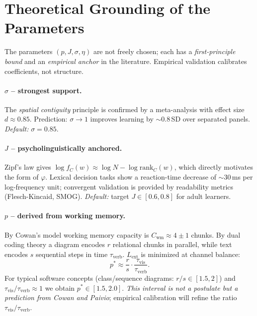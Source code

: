 \documentclass[10pt,a4paper]{article}
\begin{document}
\section{Theoretical Grounding of the Parameters}

The parameters $(p, J, \sigma, \eta)$ are not freely chosen; each has
a \emph{first-principle bound} and an \emph{empirical anchor} in the
literature. Empirical validation calibrates coefficients, not structure.

\paragraph{$\sigma$ – strongest support.}
The \emph{spatial contiguity} principle \cite{mayer2021} is confirmed
by a meta-analysis \cite{ginns2006} with effect size $d \approx 0.85$.
Prediction: $\sigma \to 1$ improves learning by $\sim 0.8$\,SD over
separated panels. \emph{Default:} $\sigma = 0.85$.

\paragraph{$J$ – psycholinguistically anchored.}
Zipf's law gives $\log f_C(w) \approx \log N - \log \mathrm{rank}_C(w)$,
which directly motivates the form of $\varphi$. Lexical decision tasks
\cite{brysbaert2018} show a reaction-time decrease of $\sim\!30$\,ms
per log-frequency unit; convergent validation is provided by
readability metrics (Flesch-Kincaid, SMOG). \emph{Default:} target
$J \in [0.6, 0.8]$ for adult learners.

\paragraph{$p$ – derived from working memory.}
By Cowan's model \cite{cowan2001} working memory capacity is
$C_{\text{wm}} \approx 4 \pm 1$ chunks. By dual coding theory
\cite{paivio1990} a diagram encodes $r$ relational chunks in parallel,
while text encodes $s$ sequential steps in time $\tau_{\text{verb}}$.
$L_{\text{ext}}$ is minimized at channel balance:
\begin{equation}
p^{*} \approx \frac{r}{s}\cdot \frac{\tau_{\text{vis}}}{\tau_{\text{verb}}}.
\end{equation}
For typical software concepts (class/sequence diagrams:
$r/s \in [1.5, 2]$) and $\tau_{\text{vis}}/\tau_{\text{verb}} \approx 1$
we obtain $p^{*} \in [1.5, 2.0]$. \emph{This interval is not a postulate
but a prediction from Cowan and Paivio}; empirical calibration will
refine the ratio $\tau_{\text{vis}}/\tau_{\text{verb}}$.
\end{document}
